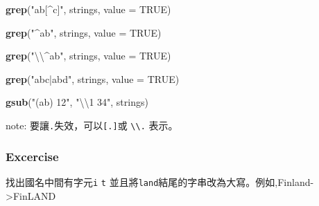 \documentclass[]{book}
\newenvironment{Shaded}{\begin{snugshade}}{\end{snugshade}}
\newcommand{\CharTok}[1]{\textcolor[rgb]{0.31,0.60,0.02}{#1}}
\newcommand{\DataTypeTok}[1]{\textcolor[rgb]{0.13,0.29,0.53}{#1}}
\newcommand{\KeywordTok}[1]{\textcolor[rgb]{0.13,0.29,0.53}{\textbf{#1}}}
\newcommand{\NormalTok}[1]{#1}
\newcommand{\OtherTok}[1]{\textcolor[rgb]{0.56,0.35,0.01}{#1}}
\newcommand{\StringTok}[1]{\textcolor[rgb]{0.31,0.60,0.02}{#1}}
\theoremstyle{definition}
\theoremstyle{definition}
\theoremstyle{definition}
\theoremstyle{remark}
\begin{document}
\begin{Shaded}
\begin{Highlighting}[]
\KeywordTok{grep}\NormalTok{(}\StringTok{"ab[^c]"}\NormalTok{, strings, }\DataTypeTok{value =} \OtherTok{TRUE}\NormalTok{)}
\end{Highlighting}
\end{Shaded}

\begin{Shaded}
\begin{Highlighting}[]
\KeywordTok{grep}\NormalTok{(}\StringTok{"^ab"}\NormalTok{, strings, }\DataTypeTok{value =} \OtherTok{TRUE}\NormalTok{) }
\end{Highlighting}
\end{Shaded}

\begin{Shaded}
\begin{Highlighting}[]
\KeywordTok{grep}\NormalTok{(}\StringTok{"}\CharTok{\textbackslash{}\textbackslash{}}\StringTok{^ab"}\NormalTok{, strings, }\DataTypeTok{value =} \OtherTok{TRUE}\NormalTok{) }
\end{Highlighting}
\end{Shaded}

\begin{Shaded}
\begin{Highlighting}[]
\KeywordTok{grep}\NormalTok{(}\StringTok{"abc|abd"}\NormalTok{, strings, }\DataTypeTok{value =} \OtherTok{TRUE}\NormalTok{) }
\end{Highlighting}
\end{Shaded}

\begin{Shaded}
\begin{Highlighting}[]
\KeywordTok{gsub}\NormalTok{(}\StringTok{"(ab) 12"}\NormalTok{, }\StringTok{"}\CharTok{\textbackslash{}\textbackslash{}}\StringTok{1 34"}\NormalTok{, strings) }
\end{Highlighting}
\end{Shaded}

note: 要讓\texttt{.}失效，可以\texttt{{[}.{]}}或
\texttt{\textbackslash{}\textbackslash{}.} 表示。

\hypertarget{excercise}{%
\subsubsection{Excercise}\label{excercise}}

找出國名中間有字元\texttt{i} \texttt{t}
並且將\texttt{land}結尾的字串改為大寫。例如,Finland-\textgreater{}FinLAND
\end{document}
